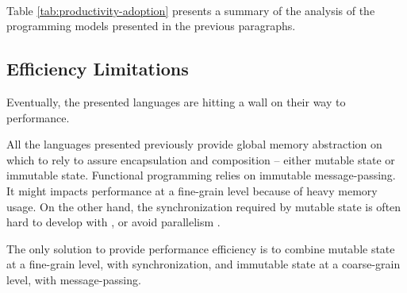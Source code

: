 \paragraph{}

Table \ref{tab:productivity-adoption} presents a summary of the analysis of the programming models presented in the previous paragraphs.


\subsection{Efficiency Limitations} \label{chapter3:software-productivity:efficiency-limitations}

Eventually, the presented languages are hitting a wall on their way to performance.

All the languages presented previously provide global memory abstraction on which to rely to assure encapsulation and composition -- either mutable state or immutable state.
Functional programming relies on immutable message-passing.
It might impacts performance at a fine-grain level because of heavy memory usage.
On the other hand, the synchronization required by mutable state is often hard to develop with \cite{Adya2002}, or avoid parallelism \cite{Pai1999,Krohn2007}.

The only solution to provide performance efficiency is to combine mutable state at a fine-grain level, with synchronization, and immutable state at a coarse-grain level, with message-passing.




